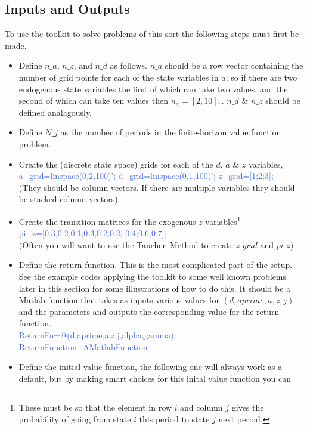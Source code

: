 \subsection{Inputs and Outputs}
To use the toolkit to solve problems of this sort the following steps must first be made.
\begin{itemize}
 \item Define $n\_{}a$, $n\_{}z$, and $n\_{}d$ as follows. $n\_{}a$ should be a row vector containing the number of grid points for each of the state variables in $a$;
     so if there are two endogenous state variables the first of which can take two values, and the second of which can take ten values then $n_a=[2,10];$.
     $n\_{}d$ \& $n\_{}z$ should be defined analagously.
 \item Define $N\_{}j$ as the number of periods in the finite-horizon value function problem.
 \item Create the (discrete state space) grids for each of the $d$, $a$ \& $z$ variables, \\
    \textcolor{RoyalBlue}{a\_{}grid=linspace(0,2,100)'; d\_{}grid=linspace(0,1,100)'; z\_{}grid=[1;2;3];} \\
       (They should be column vectors. If there are multiple variables they should be stacked column vectors)
 \item Create the transition matrices for the exogenous $z$ variables\footnote{These must be so that the element in row $i$ and column
     $j$ gives the probability of going from state $i$ this period to state $j$ next period.} \\
     \textcolor{RoyalBlue}{pi\_{}z=[0.3,0.2,0.1;0.3,0.2,0.2; 0.4,0.6,0.7];} \\
     (Often you will want to use the Tauchen Method to create $z\_{}grid$ and $pi\_{}z$)
 \item Define the return function. This is the most complicated part of the setup. See the example codes applying the toolkit to some well known problems
     later in this section for some illustrations of how to do this. It should be a Matlab function that takes as inputs various values for $(d,aprime,a,z,j)$
     and the parameters and outputs the corresponding value for the return function.\\
     \textcolor{RoyalBlue}{ReturnFn=@(d,aprime,a,z,j,alpha,gamma) ReturnFunction\_{}AMatlabFunction}
 \item Define the initial value function, the following one will always work as a default, but by making smart choices for this inital value function you can

\end{itemize}
